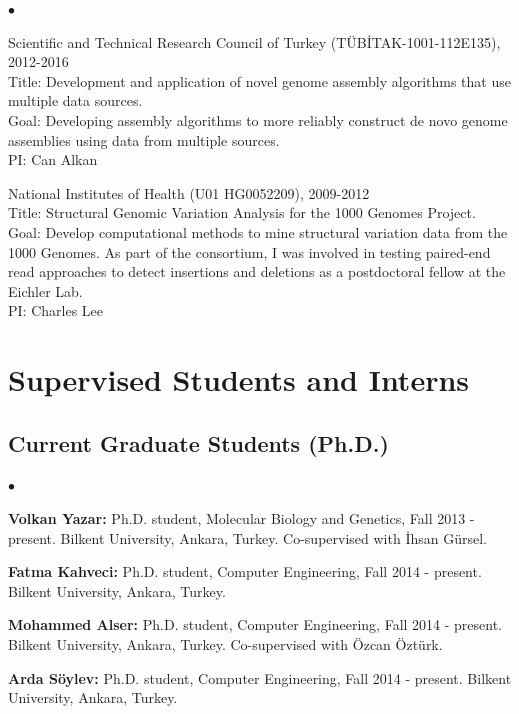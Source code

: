 \documentclass[margin,line]{res}
\newenvironment{list2}{
  \begin{list}{$\bullet$}{%
      \setlength{\itemsep}{0in}
      \setlength{\parsep}{0in} \setlength{\parskip}{0in}
      \setlength{\topsep}{0in} \setlength{\partopsep}{0in} 
      \setlength{\leftmargin}{0.2in}}}{\end{list}}
\begin{document}
\begin{resume}
\begin{list2}
                                       \item
                                         Scientific and Technical Research Council of Turkey (T\"{U}B\.{I}TAK-1001-112E135), 2012-2016\\
                                         Title: Development and application of novel genome assembly algorithms that use multiple data sources.\\
                                         Goal: Developing assembly algorithms to more reliably construct de novo genome assemblies using data from multiple sources.\\
                                         PI: Can Alkan
                                       \item
                                         National Institutes of Health (U01 HG0052209), 2009-2012\\
                                         Title: Structural Genomic Variation Analysis for the 1000 Genomes Project.\\
                                         Goal: Develop computational methods to mine structural variation data from the 1000 Genomes.
                                         As part of the consortium, I was involved in testing paired-end read approaches to detect insertions and deletions as a postdoctoral fellow at the Eichler Lab.\\
                                         PI: Charles Lee
                                       \end{list2}


\section{\sc Supervised Students and Interns}
\vspace*{-.4cm}
\subsection{\small \sc Current Graduate Students (Ph.D.)}
\begin{list2}
\item
  {\bf Volkan Yazar:} Ph.D. student, Molecular Biology and Genetics, Fall 2013 - present.
  Bilkent University, Ankara, Turkey. Co-supervised with İhsan Gürsel.
\item
  {\bf Fatma Kahveci:} Ph.D. student, Computer Engineering, Fall 2014 - present.
  Bilkent University, Ankara, Turkey.
\item
  {\bf Mohammed Alser:} Ph.D. student, Computer Engineering, Fall 2014 - present.
  Bilkent University, Ankara, Turkey. Co-supervised with Özcan Öztürk.
\item
  {\bf Arda Söylev:} Ph.D. student, Computer Engineering, Fall 2014 - present.
  Bilkent University, Ankara, Turkey. 
\end{list2}
\vspace*{-.4cm}

\end{resume}
\end{document}
